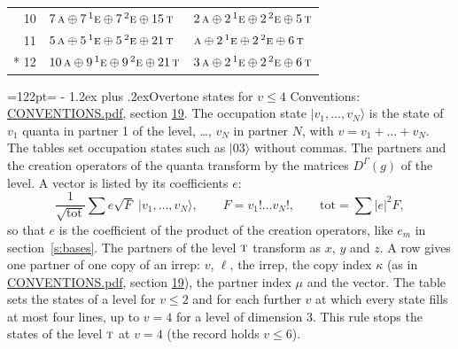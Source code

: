 \documentclass[10pt,a4paper]{article}
\makeatletter
\renewcommand\section{\@startsection{section}{1}{\z@}{-3ex plus -1ex minus -.2ex}%
  {1.2ex plus .2ex}{\normalfont\large\sffamily\bfseries\color{parttitle}}}
\newcommand{\needspace}[1]{\par\penalty-100\begingroup\dimen0=#1\relax\dimen2=\pagegoal
  \advance\dimen2-\pagetotal\ifdim\dimen0>\dimen2\relax\ifdim\dimen2>0pt\vfil\break\fi\fi
  \endgroup}
\numberwithin{equation}{section}
\newcommand{\irr}[1]{\text{\normalfont\scshape #1}}
\newcommand{\conjpair}[1]{{}^{#1}}
\newcommand{\repD}[1]{D^{#1}}
\newcommand{\mult}{\kappa}
\newcommand{\intx}{\mu}
\newcommand{\occ}[1]{\lvert #1\rangle}
\makeatother
\begin{document}
{\begin{longtable}{@{}rll@{}}
10 & $7\,\irr{a} \oplus 7\,\conjpair{1}\irr{e} \oplus 7\,\conjpair{2}\irr{e} \oplus 15\,\irr{t}$ & $2\,\irr{a} \oplus 2\,\conjpair{1}\irr{e} \oplus 2\,\conjpair{2}\irr{e} \oplus 5\,\irr{t}$\\
11 & $5\,\irr{a} \oplus 5\,\conjpair{1}\irr{e} \oplus 5\,\conjpair{2}\irr{e} \oplus 21\,\irr{t}$ & $\irr{a} \oplus 2\,\conjpair{1}\irr{e} \oplus 2\,\conjpair{2}\irr{e} \oplus 6\,\irr{t}$\\*
12 & $10\,\irr{a} \oplus 9\,\conjpair{1}\irr{e} \oplus 9\,\conjpair{2}\irr{e} \oplus 21\,\irr{t}$ & $3\,\irr{a} \oplus 2\,\conjpair{1}\irr{e} \oplus 2\,\conjpair{2}\irr{e} \oplus 6\,\irr{t}$\\
\bottomrule\end{longtable}}
\needspace{122pt}
\section{Overtone states for \texorpdfstring{$v \le 4$}{v \textleq\ 4}}\label{s:overtone_states}
Conventions: \href{../../CONVENTIONS.pdf}{CONVENTIONS.pdf}, section \href{../../CONVENTIONS.pdf\#conv.19}{19}.
\leavevmode\label{n:vector.occupation}\label{n:local.quanta.partner}\label{n:local.weight.occupation}The occupation state $\occ{v_1, \dots, v_N}$ is the state of $v_1$ quanta in partner 1 of the level, \dots, $v_N$ in partner $N$, with $v = v_1 + \dots + v_N$. The tables set occupation states such as $\occ{03}$ without commas. The partners and the creation operators of the quanta transform by the matrices $\repD{\Gamma}(g)$ of the level. A vector is listed by its coefficients $e$:
\begin{equation}\label{e:occupation}\frac{1}{\sqrt{\mathrm{tot}}}\sum e\sqrt{F}\;\occ{v_1, \dots, v_N},\qquad F = v_1!\dots v_N!,\qquad \mathrm{tot} = \sum |e|^2F,\end{equation}
so that $e$ is the coefficient of the product of the creation operators, like $e_m$ in section~\ref{s:bases}. The partners of the level $\irr{t}$ transform as $x$, $y$ and $z$. A row gives one partner of one copy of an irrep: $v$, $\ell$, the irrep, the copy index $\mult$ (as in \href{../../CONVENTIONS.pdf}{CONVENTIONS.pdf}, section \href{../../CONVENTIONS.pdf\#conv.19}{19}), the partner index $\intx$ and the vector.
The table sets the states of a level for $v \le 2$ and for each further $v$ at which every state fills at most four lines, up to $v = 4$ for a level of dimension 3. This rule stops the states of the level $\irr{t}$ at $v = 4$ (the record holds $v \le 6$).
\end{document}
